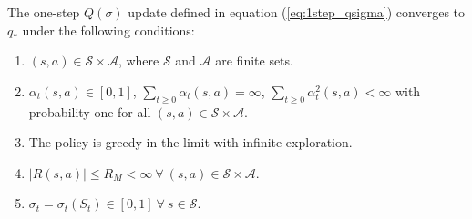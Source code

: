 \begin{theorem}
The one-step $Q(\sigma)$ update defined in equation (\ref{eq:1step_qsigma}) converges to $q_*$ under the following conditions:
\begin{enumerate}
\item $(s,a) \in \mathcal{S} \times \mathcal{A}$, where $\mathcal{S}$ and $\mathcal{A}$ are finite sets.
\item $\alpha_t(s,a) \in [0,1]$, $\sum_{t\geq 0} \alpha_t (s,a) = \infty$, $\sum_{t \geq 0} \alpha^2_t (s,a) < \infty$ with probability one for all $(s, a) \in \mathcal{S} \times \mathcal{A}$.
\item The policy is greedy in the limit with infinite exploration.
\item $\big| R(s,a) \big| \leq R_M  < \infty \ \forall \ (s,a) \in \mathcal{S} \times \mathcal{A}$.
\item $\sigma_t = \sigma_t(S_t) \in [0,1] \ \forall \ s \in \mathcal{S}$. 
\end{enumerate}
\end{theorem}

